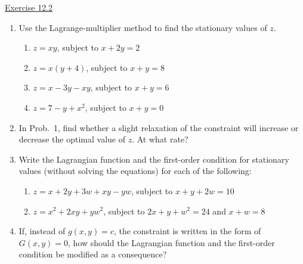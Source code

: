 \underline{Exercise 12.2}
\begin{enumerate}
\item[1.] Use the Lagrange-multiplier method to find the stationary values of $z$.
\begin{enumerate}
\item[(a)] $z = xy$, subject to $x + 2y = 2$
\item[(b)] $z = x(y + 4)$, subject to $x + y = 8$
\item[(c)] $z = x - 3y - xy$, subject to $x + y = 6$
\item[(d)] $z = 7 - y + x^{2}$, subject to $x + y = 0$
\end{enumerate}

\item[2.] In Prob.~1, find whether a slight relaxation of the constraint will increase or decrease the optimal value of $z$. At what rate?

\item[3.] Write the Lagrangian function and the first-order condition for stationary values (without solving the equations) for each of the following:
\begin{enumerate}
\item[(a)] $z = x + 2y + 3w + xy - yw$, subject to $x + y + 2w = 10$
\item[(b)] $z = x^{2} + 2xy + yw^{2}$, subject to $2x + y + w^{2} = 24$ and $x + w = 8$
\end{enumerate}

\item[4.] If, instead of $g(x, y) = c$, the constraint is written in the form of $G(x, y) = 0$, how should the Lagrangian function and the first-order condition be modified as a consequence?

\end{enumerate}
